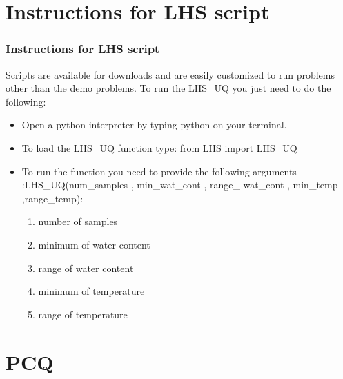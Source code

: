 \documentclass[10pt]{beamer}
\begin{document}
\section{Instructions for LHS script}
\begin{frame}
\frametitle{Instructions for LHS script}
Scripts are available for downloads and are easily customized to run problems other than the demo problems. To run the LHS\_UQ you just need to do the following:
 \begin{itemize}
 
 \item Open a python interpreter by typing python on your terminal.
 \item To load the LHS\_UQ function type: from LHS import LHS\_UQ 
 \item To run the function you need to provide the following arguments :\newline LHS\_UQ(num\_samples , min\_wat\_cont , range\_ wat\_cont , min\_temp ,range\_temp):
   \begin{enumerate}
 \item number of samples
 \item minimum of water content
 \item range of water content
 \item minimum of temperature
 \item range of temperature
 \end{enumerate}
 \end{itemize}
\end{frame}

\section{PCQ}
\end{document}
